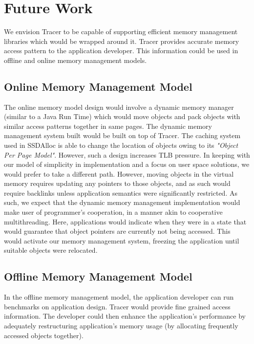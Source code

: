 \section{Future Work}
\label{sec:futurework}
\paragraph{}
We envision Tracer to be capable of supporting efficient memory management libraries which would be wrapped around it. Tracer provides accurate memory access pattern to the application developer. This information could be used in offline and online memory management models.

\subsection{Online Memory Management Model}
The online memory model design would involve a dynamic memory manager (similar to a Java Run Time) which would move objects and pack objects with similar access patterns together in same pages.  The dynamic memory management system built would be built on top of Tracer. The caching system used in SSDAlloc is able to change the location of objects owing to its {\emph{"Object Per Page Model"}}. However, such a design increases TLB pressure. In keeping with our model of simplicity in implementation and a focus on user space solutions, we would prefer to take a different path. However, moving objects in the virtual memory requires updating any pointers to those objects, and as such would require backlinks unless application semantics were significantly restricted. As such, we expect that the dynamic memory management implementation would make user of programmer's cooperation, in a manner akin to cooperative multithreading. Here, applications would indicate when they were in a state that would guarantee that object pointers are currently not being accessed. This would activate our memory management system, freezing the application until suitable objects were relocated.

\subsection{Offline Memory Management Model}
In the offline memory management model, the application developer can run benchmarks on application design. Tracer would provide fine grained access information. The developer could then enhance the application's performance by adequately restructuring application's memory usage (by allocating frequently accessed objects together).

